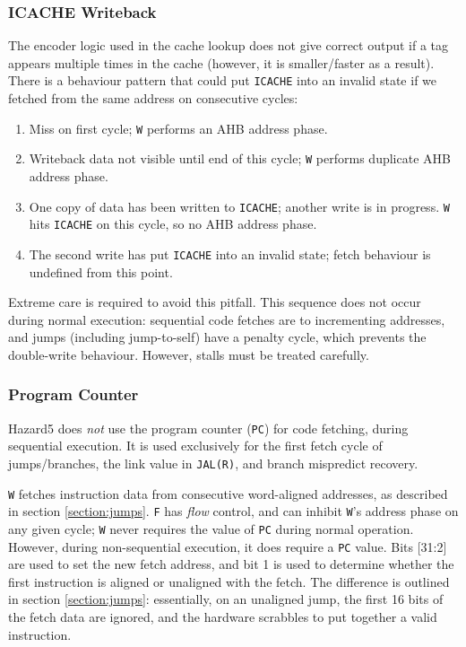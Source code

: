 \documentclass{article}
\begin{document}
\subsubsection{ICACHE Writeback}

The encoder logic used in the cache lookup does not give correct output if a tag appears multiple times in the cache (however, it is smaller/faster as a result). There is a behaviour pattern that could put \texttt{ICACHE} into an invalid state if we fetched from the same address on consecutive cycles:

\begin{enumerate}
	\item Miss on first cycle; \texttt{W} performs an AHB address phase.
	\item Writeback data not visible until end of this cycle; \texttt{W} performs duplicate AHB address phase.
	\item One copy of data has been written to \texttt{ICACHE}; another write is in progress. \texttt{W} hits \texttt{ICACHE} on this cycle, so no AHB address phase.
	\item The second write has put \texttt{ICACHE} into an invalid state; fetch behaviour is undefined from this point.
\end{enumerate}

Extreme care is required to avoid this pitfall. This sequence does not occur during normal execution: sequential code fetches are to incrementing addresses, and jumps (including jump-to-self) have a penalty cycle, which prevents the double-write behaviour. However, stalls must be treated carefully.

\subsubsection{Program Counter}

Hazard5 does \textit{not} use the program counter (\texttt{PC}) for code fetching, during sequential execution. It is used exclusively for the first fetch cycle of jumps/branches, the link value in \texttt{JAL(R)}, and branch mispredict recovery.

\texttt{W} fetches instruction data from consecutive word-aligned addresses, as described in section \ref{section:jumps}. \texttt{F} has \textit{flow} control, and can inhibit \texttt{W}'s address phase on any given cycle; \texttt{W} never requires the value of \texttt{PC} during normal operation. However, during non-sequential execution, it does require a \texttt{PC} value. Bits [31:2] are used to set the new fetch address, and bit 1 is used to determine whether the first instruction is aligned or unaligned with the fetch. The difference is outlined in section \ref{section:jumps}: essentially, on an unaligned jump, the first 16 bits of the fetch data are ignored, and the hardware scrabbles to put together a valid instruction.
\end{document}
